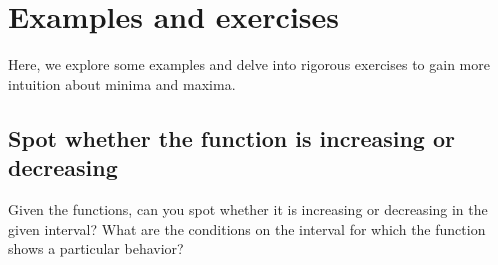 \section{Examples and exercises}

Here, we explore some examples and delve into rigorous exercises to gain more intuition about minima and maxima.


\subsection{Spot whether the function is increasing or decreasing}

Given the functions, can you spot whether it is increasing or decreasing in the given interval? What are the conditions on the interval for which the function shows a particular behavior?

